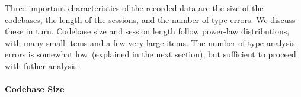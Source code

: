 \documentclass[english,submission,cleveref]{programming}
\begin{document}
Three important characteristics of the recorded data are the size of the codebases,
the length of the sessions, and the number of type
errors.
We discuss these in turn.
Codebase size and session length follow power-law
distributions, with
many small items and a few very large items.
The number of type analysis errors is somewhat low~(explained in the next
section), but sufficient to proceed with futher analysis.


\paragraph{Codebase Size}

\begin{figure}[t]


\end{figure}
\end{document}
